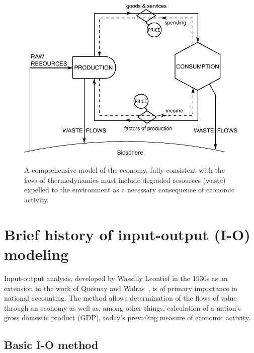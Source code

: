 \begin{figure}[!ht]
\centering\
\includegraphics[width=\linewidth]{Part_0/Chapter_Introduction/images/PERKS.pdf}
\caption[A comprehensive biophysical model of the economy]{A comprehensive model 
of the economy, fully consistent with the laws of thermodynamics 
must include degraded resources (waste) expelled 
to the environment as a necessary consequence of economic activity.}
\label{fig:metabolic_economy}
\end{figure}


\section{Brief history of input-output (I-O) modeling}
\label{sec:history}

Input-output analysis, developed by Wassilly Leontief in the 1930s 
as an extension to the work of Quesnay and Walras~\cite{Leontief1936}, 
is of primary importance in national accounting. 
The method allows determination of the flows of value through
an economy as well as, 
among other things, 
calculation of a nation's gross domestic product (GDP), 
today's prevailing measure of economic activity.



\subsection{Basic I-O method}
\label{sec:IO_basic}

